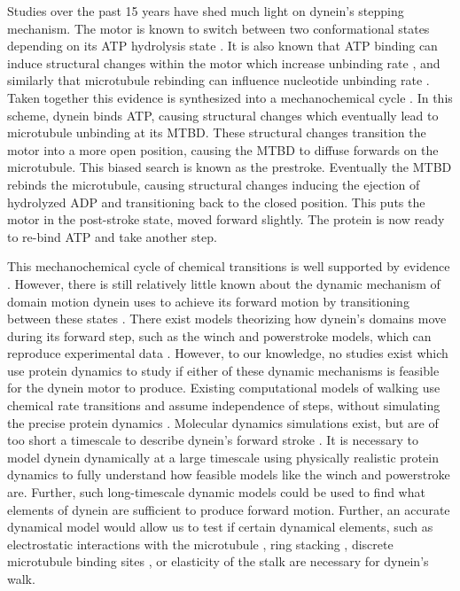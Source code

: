 \documentclass[9pt,twocolumn,twoside]{article}
\begin{document}
Studies over the past 15 years have shed much light on dynein's stepping mechanism. The motor is known to switch between two conformational states depending on its ATP hydrolysis state \cite{burgess-paper, FRETstatepaper, carter-paper, nicastro, schmidt-carter}. It is also known that ATP binding can induce structural changes within the motor which increase unbinding rate \cite{leschziner, carter-paper}, and similarly that microtubule rebinding can influence nucleotide unbinding rate \cite{mt-atp-coupling}. Taken together this evidence is synthesized into a mechanochemical cycle \cite{cianfroccoreview, imamulamodel, tsygankovscheme}. In this scheme, dynein binds ATP, causing structural changes which eventually lead to microtubule unbinding at its MTBD. These structural changes transition the motor into a more open position, causing the MTBD to diffuse forwards on the microtubule. This biased search is known as the prestroke. Eventually the MTBD rebinds the microtubule, causing structural changes inducing the ejection of hydrolyzed ADP and transitioning back to the closed position. This puts the motor in the post-stroke state, moved forward slightly. The protein is now ready to re-bind ATP and take another step.

This mechanochemical cycle of chemical transitions is well supported by evidence \cite{citemore}. However, there is still relatively little known about the dynamic mechanism of domain motion dynein uses to achieve its forward motion by transitioning between these states \cite{lippert}. There exist models theorizing how dynein's domains move during its forward step, such as the winch \cite{} and powerstroke \cite{} models, which can reproduce experimental data \cite{}. However, to our knowledge, no studies exist which use protein dynamics to study if either of these dynamic mechanisms is feasible for the dynein motor to produce. Existing computational models of walking use chemical rate transitions and assume independence of steps, without simulating the precise protein dynamics \cite{}. Molecular dynamics simulations exist, but are of too short a timescale to describe dynein's forward stroke \cite{}. It is necessary to model dynein dynamically at a large timescale using physically realistic protein dynamics to fully understand how feasible models like the winch and powerstroke are. Further, such long-timescale dynamic models could be used to find what elements of dynein are sufficient to produce forward motion. Further, an accurate dynamical model would allow us to test if certain dynamical elements, such as electrostatic interactions with the microtubule \cite{longrangemt}, ring stacking \cite{sarlahmodel}, discrete microtubule binding sites \cite{trottmodel}, or elasticity of the stalk \cite{burgess-paper} are necessary for dynein's walk.
\end{document}
